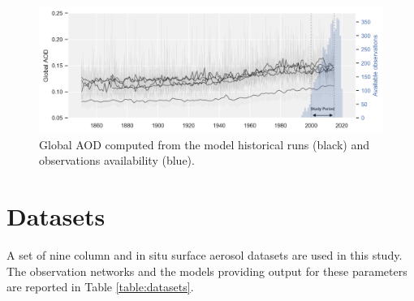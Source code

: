\documentclass[journal abbreviation, manuscript]{copernicus}
\begin{document}
\begin{figure}
 \centering
 \includegraphics[width=12cm]{../scripts/figs/hist_runs.png}
 \caption{Global AOD computed from the model historical runs (black) and observations availability (blue).}
 \label{fig:hist_runs}
\end{figure}


\section{Datasets}
A set of nine column and in situ surface aerosol datasets are used in this study. The observation networks and the models providing output for these parameters are reported in Table \ref{table:datasets}.
\end{document}
